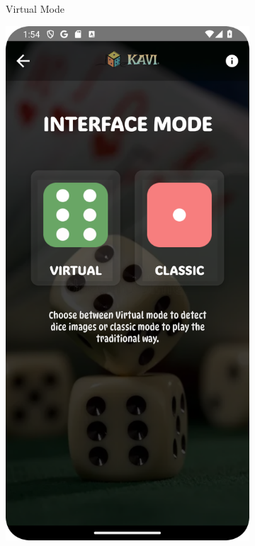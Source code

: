 \begin{figure}[h]
\begin{subfigure}[b]{0.27\textwidth}
        \caption{Virtual Mode}
        \label{fig:virtual_mode}
    \end{subfigure}
    \hfill
    \begin{subfigure}[b]{0.27\textwidth}
        \includegraphics[width=\textwidth]{img/interface mode.png}

\end{subfigure}
\end{figure}
